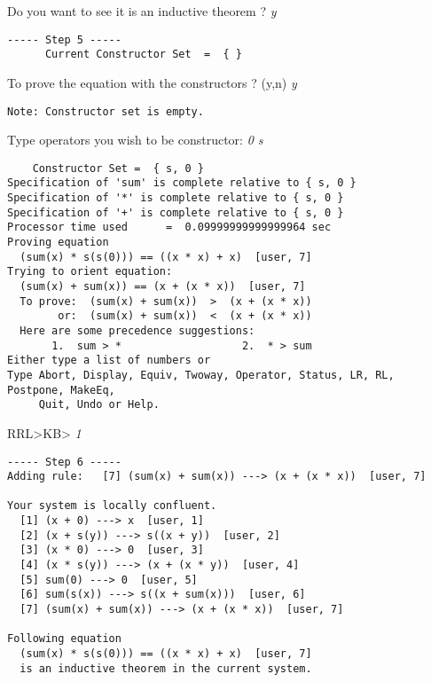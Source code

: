 Do you want to see it is an inductive theorem ? {\em y}
\begin{verbatim}
----- Step 5 -----
      Current Constructor Set  =  { }
\end{verbatim}
To prove the equation with the constructors ? (y,n) {\em y}
\begin{verbatim}
Note: Constructor set is empty.
\end{verbatim}
Type operators you wish to be constructor: {\em 0 s}
\begin{verbatim}
    Constructor Set =  { s, 0 }
Specification of 'sum' is complete relative to { s, 0 }
Specification of '*' is complete relative to { s, 0 }
Specification of '+' is complete relative to { s, 0 }
Processor time used      =  0.09999999999999964 sec
Proving equation
  (sum(x) * s(s(0))) == ((x * x) + x)  [user, 7]
Trying to orient equation: 
  (sum(x) + sum(x)) == (x + (x * x))  [user, 7]
  To prove:  (sum(x) + sum(x))  >  (x + (x * x))
        or:  (sum(x) + sum(x))  <  (x + (x * x))
  Here are some precedence suggestions:
       1.  sum > *                   2.  * > sum
Either type a list of numbers or
Type Abort, Display, Equiv, Twoway, Operator, Status, LR, RL, Postpone, MakeEq,
     Quit, Undo or Help.
\end{verbatim}
RRL>KB> {\em 1}
\begin{verbatim}
----- Step 6 -----
Adding rule:   [7] (sum(x) + sum(x)) ---> (x + (x * x))  [user, 7]

Your system is locally confluent.
  [1] (x + 0) ---> x  [user, 1]
  [2] (x + s(y)) ---> s((x + y))  [user, 2]
  [3] (x * 0) ---> 0  [user, 3]
  [4] (x * s(y)) ---> (x + (x * y))  [user, 4]
  [5] sum(0) ---> 0  [user, 5]
  [6] sum(s(x)) ---> s((x + sum(x)))  [user, 6]
  [7] (sum(x) + sum(x)) ---> (x + (x * x))  [user, 7]

Following equation
  (sum(x) * s(s(0))) == ((x * x) + x)  [user, 7]
  is an inductive theorem in the current system.
\end{verbatim}
\rm
\normalsize
